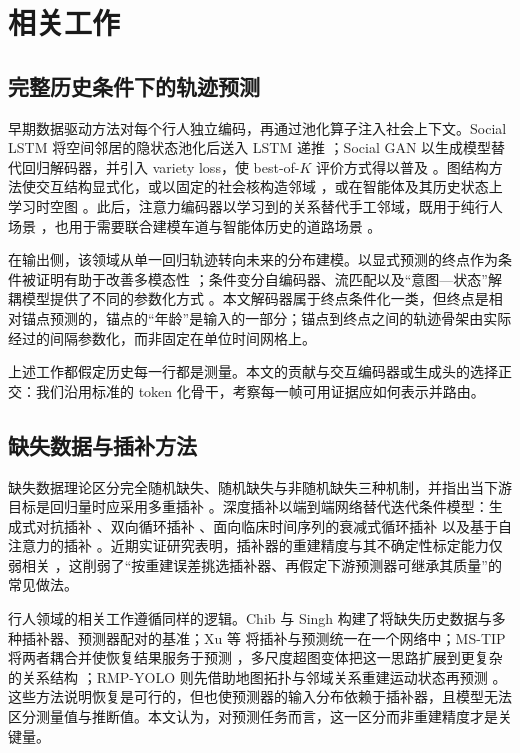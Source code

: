 \section{相关工作}
\label{sec:related}

\subsection{完整历史条件下的轨迹预测}

早期数据驱动方法对每个行人独立编码，再通过池化算子注入社会上下文。Social LSTM 将空间邻居的隐状态池化后送入 LSTM 递推 \cite{alahi2016social}；Social GAN 以生成模型替代回归解码器，并引入 variety loss，使 best-of-$K$ 评价方式得以普及 \cite{gupta2018social}。图结构方法使交互结构显式化，或以固定的社会核构造邻域 \cite{mohamed2020social}，或在智能体及其历史状态上学习时空图 \cite{salzmann2020trajectron,kosaraju2020social}。此后，注意力编码器以学习到的关系替代手工邻域，既用于纯行人场景 \cite{yuan2021agentformer}，也用于需要联合建模车道与智能体历史的道路场景 \cite{liang2020lane,gao2020vectornet,ngiam2022scene,shi2022motion,nayakanti2022wayformer}。

在输出侧，该领域从单一回归轨迹转向未来的分布建模。以显式预测的终点作为条件被证明有助于改善多模态性 \cite{mangalam2020not}；条件变分自编码器、流匹配以及“意图—状态”解耦模型提供了不同的参数化方式 \cite{fu2025moflow,zhang2024demo}。本文解码器属于终点条件化一类，但终点是相对锚点预测的，锚点的“年龄”是输入的一部分；锚点到终点之间的轨迹骨架由实际经过的间隔参数化，而非固定在单位时间网格上。

上述工作都假定历史每一行都是测量。本文的贡献与交互编码器或生成头的选择正交：我们沿用标准的 token 化骨干，考察每一帧可用证据应如何表示并路由。

\subsection{缺失数据与插补方法}

缺失数据理论区分完全随机缺失、随机缺失与非随机缺失三种机制，并指出当下游目标是回归量时应采用多重插补 \cite{little2019missing,vanbuuren2018flexible}。深度插补以端到端网络替代迭代条件模型：生成式对抗插补 \cite{yoon2018gain}、双向循环插补 \cite{cao2018brits}、面向临床时间序列的衰减式循环插补 \cite{che2018gru} 以及基于自注意力的插补 \cite{du2023saits}。近期实证研究表明，插补器的重建精度与其不确定性标定能力仅弱相关 \cite{hossain2025beyond}，这削弱了“按重建误差挑选插补器、再假定下游预测器可继承其质量”的常见做法。

行人领域的相关工作遵循同样的逻辑。Chib 与 Singh \cite{chib2024pedestrian} 构建了将缺失历史数据与多种插补器、预测器配对的基准；Xu 等 \cite{xu2023uncovering} 将插补与预测统一在一个网络中；MS-TIP 将两者耦合并使恢复结果服务于预测 \cite{chib2024mstip}，多尺度超图变体把这一思路扩展到更复杂的关系结构 \cite{chib2026hypergraph}；RMP-YOLO 则先借助地图拓扑与邻域关系重建运动状态再预测 \cite{sun2025rmpyolo}。这些方法说明恢复是可行的，但也使预测器的输入分布依赖于插补器，且模型无法区分测量值与推断值。本文认为，对预测任务而言，这一区分而非重建精度才是关键量。

